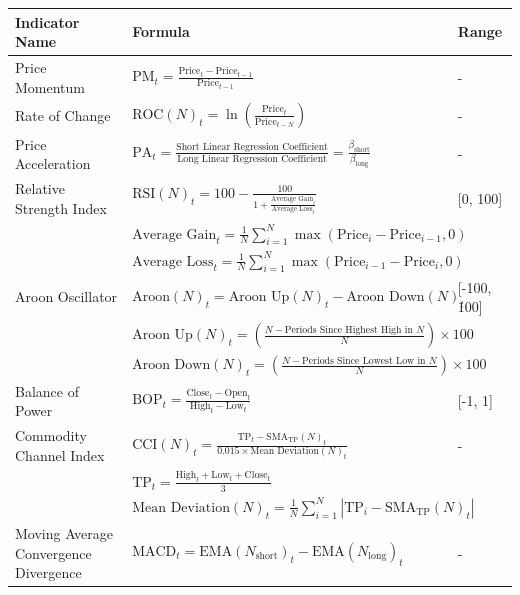 \begin{table}[htb!]
\centering
\footnotesize
\begin{tabularx}{\textwidth}{@{}lXl@{}}
\toprule
\textbf{Indicator Name} & \textbf{Formula} & \textbf{Range} \\
\midrule
Price Momentum & $\text{PM}_t = \frac{\text{Price}_t - \text{Price}_{t-1}}{\text{Price}_{t-1}}$ & - \\
\addlinespace
Rate of Change & $\text{ROC}(N)_t = \ln\left(\frac{\text{Price}_t}{\text{Price}_{t-N}}\right)$ & - \\
\addlinespace
Price Acceleration & $\text{PA}_t = \frac{\text{Short Linear Regression Coefficient}}{\text{Long Linear Regression Coefficient}} = \frac{\beta_\text{short}}{\beta_\text{long}}$ & - \\
\addlinespace
Relative Strength Index & $\text{RSI}(N)_t = 100 - \frac{100}{1 + \frac{\text{Average Gain}_t}{\text{Average Loss}_t}}$ & [0, 100] \\
\addlinespace
& $\text{Average Gain}_t = \frac{1}{N}\sum_{i=1}^{N} \max(\text{Price}_i - \text{Price}_{i-1}, 0)$ & \\
\addlinespace
& $\text{Average Loss}_t = \frac{1}{N}\sum_{i=1}^{N} \max(\text{Price}_{i-1} - \text{Price}_i, 0)$ & \\
\addlinespace
Aroon Oscillator & $\text{Aroon}(N)_t = \text{Aroon Up}(N)_t - \text{Aroon Down}(N)_t$ & [-100, 100] \\
\addlinespace
& $\text{Aroon Up}(N)_t = \left( \frac{N - \text{Periods Since Highest High in } N}{N} \right) \times 100$ & \\
\addlinespace
& $\text{Aroon Down}(N)_t = \left( \frac{N - \text{Periods Since Lowest Low in } N}{N} \right) \times 100$ & \\
\addlinespace
Balance of Power & $\text{BOP}_t = \frac{\text{Close}_t - \text{Open}_t}{\text{High}_t - \text{Low}_t}$ & [-1, 1] \\
\addlinespace
Commodity Channel Index & $\text{CCI}(N)_t = \frac{\text{TP}_t - \text{SMA}_\text{TP}(N)_t}{0.015 \times \text{Mean Deviation}(N)_t}$ & - \\
\addlinespace
& $\text{TP}_t = \frac{\text{High}_t + \text{Low}_t + \text{Close}_t}{3}$ & \\
\addlinespace
& $\text{Mean Deviation}(N)_t = \frac{1}{N}\sum_{i=1}^{N} |\text{TP}_i - \text{SMA}_\text{TP}(N)_t|$ & \\
\addlinespace
Moving Average Convergence Divergence & $\text{MACD}_t = \text{EMA}(N_{\text{short}})_t - \text{EMA}(N_{\text{long}})_t $ & - \\

\end{tabularx}
\end{table}
